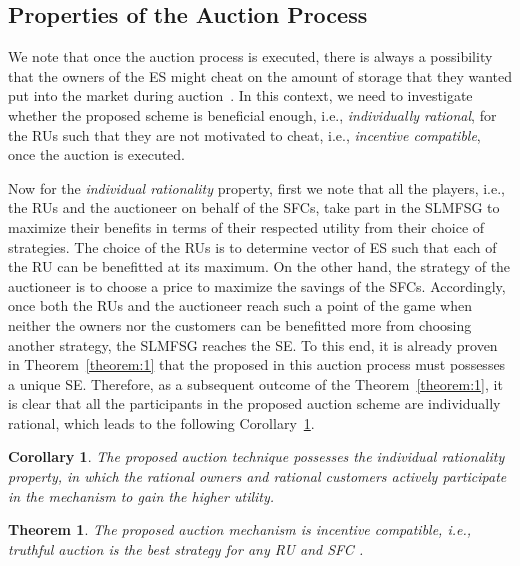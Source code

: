 \documentclass[journal,10pt]{IEEEtran}
\newtheorem{corollary}{Corollary}
\newtheorem{theorem}{\bf Theorem}
\begin{document}
\subsection{Properties of the Auction Process}We note that once the auction process is executed, there is always a possibility that the owners of the ES might cheat on the amount of storage that they wanted put into the market during auction~\cite{Ma-JTSG:2014}. In this context, we need to investigate whether the proposed scheme is beneficial enough, i.e., \emph{individually rational}, for the RUs such that they are not motivated to cheat, i.e., \emph{incentive compatible}, once the auction is executed.

Now for the \emph{individual rationality} property, first we note that all the players, i.e., the RUs and the auctioneer on behalf of the SFCs, take part in the SLMFSG to maximize their benefits in terms of their respected utility from their choice of strategies. The choice of the RUs is to determine vector of ES  such that each of the RU can be benefitted at its maximum. On the other hand,  the strategy of the auctioneer is to choose a price  to maximize the savings of the SFCs. Accordingly, once both the RUs and the auctioneer reach such a point of the game when neither the owners nor the customers can be benefitted more from choosing another strategy, the SLMFSG reaches the SE. To this end, it is already proven in Theorem~\ref{theorem:1} that the proposed  in this auction process must possesses a unique SE. Therefore, as a subsequent outcome of the Theorem~\ref{theorem:1}, it is clear that all the participants in the proposed auction scheme are individually rational, which leads to the following Corollary~\ref{corollary:1}.
\begin{corollary}
The proposed auction technique possesses the individual rationality property, in which the  rational owners and  rational customers actively participate in the mechanism to gain the higher utility.
\label{corollary:1}
\end{corollary}
\begin{theorem}
The proposed auction mechanism is incentive compatible, i.e., truthful auction is the best strategy for any RU  and SFC .
\label{theorem:3}
\end{theorem}
\end{document}
